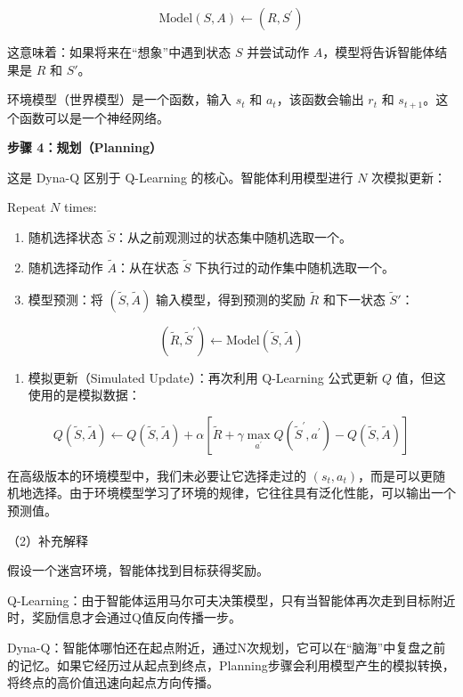 \[
\mathrm{Model}(S,A)\leftarrow(R,S^{\prime})
\]

这意味着：如果将来在``想象''中遇到状态 \(S\) 并尝试动作 \(A\)，模型将告诉智能体结果是 \(R\) 和 \(S'\)。

环境模型（世界模型）是一个函数，输入 \(s_t\) 和 \(a_t\)，该函数会输出 \(r_t\) 和 \(s_{t+1}\)。这个函数可以是一个神经网络。

\textbf{步骤 4：规划（Planning）}

这是 Dyna-Q 区别于 Q-Learning 的核心。智能体利用模型进行 \(N\) 次模拟更新：

Repeat \(N\) times:

\begin{enumerate}
\def\labelenumi{\arabic{enumi}.}
\tightlist
\item
  随机选择状态 \(\tilde{S}\)：从之前观测过的状态集中随机选取一个。
\item
  随机选择动作 \(\tilde{A}\)：从在状态 \(\tilde{S}\) 下执行过的动作集中随机选取一个。
\item
  模型预测：将 \((\tilde{S},\tilde{A})\) 输入模型，得到预测的奖励 \(\tilde{R}\) 和下一状态 \(\tilde{S}'\)：
\end{enumerate}

\[
(\tilde{R},\tilde{S}^{\prime})\leftarrow \mathrm{Model}(\tilde{S},\tilde{A})
\]

\begin{enumerate}
\def\labelenumi{\arabic{enumi}.}
\setcounter{enumi}{3}
\tightlist
\item
  模拟更新（Simulated Update）：再次利用 Q-Learning 公式更新 \(Q\) 值，但这使用的是模拟数据：
\end{enumerate}

\[
Q(\tilde{S},\tilde{A})\leftarrow Q(\tilde{S},\tilde{A})+\alpha[\tilde{R}+\gamma\max_{a^{\prime}}Q(\tilde{S}^{\prime},a^{\prime})-Q(\tilde{S},\tilde{A})]
\]

在高级版本的环境模型中，我们未必要让它选择走过的 \((s_t,a_t)\)，而是可以更随机地选择。由于环境模型学习了环境的规律，它往往具有泛化性能，可以输出一个预测值。

（2）补充解释

假设一个迷宫环境，智能体找到目标获得奖励。

Q-Learning：由于智能体运用马尔可夫决策模型，只有当智能体再次走到目标附近时，奖励信息才会通过Q值反向传播一步。

Dyna-Q：智能体哪怕还在起点附近，通过N次规划，它可以在``脑海''中复盘之前的记忆。如果它经历过从起点到终点，Planning步骤会利用模型产生的模拟转换，将终点的高价值迅速向起点方向传播。

